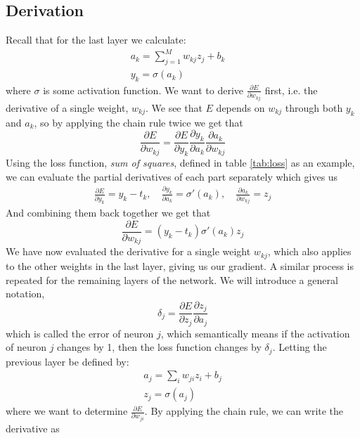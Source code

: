\subsection{Derivation}
Recall that for the last layer we calculate:
\begin{align}
a_k = \sum_{j= 1}^M w_{kj} z_j + b_k \quad  \\
y_k = \sigma(a_k)  \quad  
\end{align}
where $\sigma$ is some activation function. We want to derive $\frac{\partial
	E}{\partial w_{kj}}$ first, i.e. the derivative of a single weight, $w_{kj}$. We
see that $E$ depends on $w_{kj}$ through both $y_k$ and $a_k$, so by applying
the chain rule twice we get that
\begin{equation}
\frac{\partial E}{\partial w_{kj}} = \frac{\partial E }{\partial
	y_k}\frac{\partial y_k}{\partial a_k} \frac{\partial a_k}{\partial w_{kj}}
\end{equation}
Using the loss function, \emph{sum of squares}, defined in table \ref{tab:loss}
as an example, we can evaluate the partial derivatives of each part separately
which gives us
\begin{align}
\frac{\partial E }{\partial y_k} = y_k - t_k , \quad \frac{\partial y_k
}{\partial a_k} = \sigma'(a_k) , \quad   \frac{\partial a_k }{\partial w_{kj}} =
z_j
\end{align}
And combining them back together we get that
\begin{equation}
\frac{\partial E}{\partial w_{kj}} = (y_k - t_k) \sigma'(a_k) z_j
\end{equation}
We have now evaluated the derivative for a single weight $w_{kj}$, which also
applies to the other weights in the last layer, giving us our gradient. A
similar process is repeated for the remaining layers of the network. We will
introduce a general notation, 
\begin{equation}
\label{delta}
\delta_j =  \frac{\partial E }{\partial z_j}\frac{\partial z_j}{\partial a_j}
\end{equation}
which is called the error of neuron $j$, which semantically means if the
activation of neuron $j$ changes by 1, then the loss function changes by
$\delta_j$. Letting the previous layer be defined by:
\begin{align}
\label{eq:easy}
a_j = \sum_i w_{ji} z_i + b_j\\
z_j = \sigma(a_j)
\end{align}
where we want to determine $\frac{\partial E}{\partial w_{ji}}$. By applying the
chain rule, we can write the derivative as 
